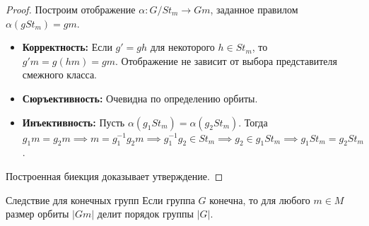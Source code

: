 \begin{proof}
	Построим отображение $\alpha \colon G/St_m \to Gm$, заданное правилом $\alpha(gSt_m) = gm$.
	\begin{itemize}
		\item \textbf{Корректность:} Если $g' = gh$ для некоторого $h \in St_m$, то $g'm = g(hm) = gm$.
		Отображение не зависит от выбора представителя смежного класса.
		\item \textbf{Сюръективность:} Очевидна по определению орбиты.
		\item \textbf{Инъективность:} Пусть $\alpha(g_1 St_m) = \alpha(g_2 St_m)$. Тогда $g_1 m = g_2 m \implies m = g_1^{-1}g_2 m \implies g_1^{-1}g_2 \in St_m \implies g_2 \in g_1 St_m \implies g_1 St_m = g_2 St_m$.
	\end{itemize}
	Построенная биекция доказывает утверждение.
\end{proof}

\begin{Corollary}{Следствие для конечных групп}{}
	Если группа $G$ конечна, то для любого $m \in M$ размер орбиты $|Gm|$ делит порядок группы $|G|$.
\end{Corollary}
